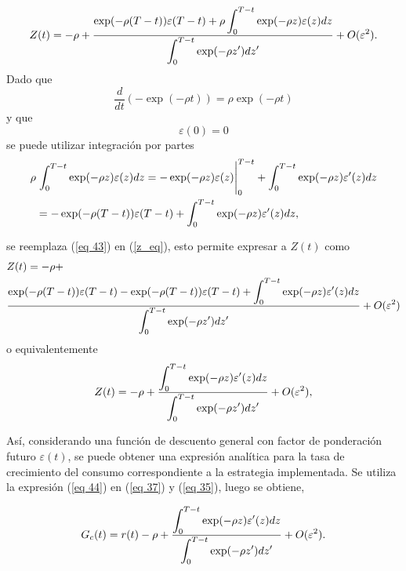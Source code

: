 \begin{equation}
\label{z_eq}
Z(t)=- \rho + \dfrac{\exp (-\rho (T-t)) \varepsilon(T-t)+ \rho \displaystyle  \int_0^{T-t} \exp (- \rho z) \varepsilon(z) dz }{\displaystyle \int_0^{T-t} \exp (- \rho z') dz' }+ O(\varepsilon^2).    
\end{equation}
%
\noindent Dado que
$$\dfrac{d}{dt}(- \exp (-\rho t))= \rho \exp(- \rho t)$$
%
y que 
$$\varepsilon(0)=0$$
%
\noindent se puede utilizar integración por partes
\begin{equation}
\label{eq 43}
    \begin{split}
        \rho &\displaystyle \left.\int_0^{T-t} \exp (- \rho z) \varepsilon(z) dz = - \exp (- \rho z) \varepsilon(z) \right|^{T-t}_ 0 + \displaystyle \int_0^{T-t} \exp (- \rho z) \varepsilon'(z) dz \\
        &= - \exp(- \rho(T-t)) \varepsilon(T-t) + \displaystyle \int_0^{T-t} \exp (- \rho z) \varepsilon'(z) dz,
    \end{split}
\end{equation}

\noindent se reemplaza (\ref{eq 43}) en (\ref{z_eq}), esto permite expresar a $Z(t)$ como
\begin{equation*}
 \begin{split}
    & Z(t)=  - \rho + \\ &\dfrac{\exp (-\rho (T-t)) \varepsilon(T-t)- \exp(- \rho(T-t)) \varepsilon(T-t) + \displaystyle \int_0^{T-t} \exp (- \rho z) \varepsilon'(z) dz}{\displaystyle \int_0^{T-t} \exp (- \rho z') dz' }+ O(\varepsilon^2)
 \end{split}    
\end{equation*}
o equivalentemente
\begin{equation}
\label{eq 44}
    Z(t)= - \rho + \dfrac{\displaystyle \int_0^{T-t} \exp(- \rho z ) \varepsilon' (z) dz}{\displaystyle \int_0^{T-t} \exp(- \rho z' )  dz'}+ O(\varepsilon^2),
\end{equation}

Así, considerando una función de descuento general con factor de ponderación futuro $\varepsilon(t)$, se puede obtener una expresión analítica para la tasa de crecimiento del consumo correspondiente a la estrategia implementada. Se utiliza la expresión (\ref{eq 44}) en (\ref{eq 37}) y (\ref{eq 35}), luego se obtiene,

\begin{equation}
\label{eq 45}
G_c(t)= r(t) - \rho +  \dfrac{\displaystyle \int_0^{T-t} \exp(- \rho z ) \varepsilon' (z) dz}{\displaystyle \int_0^{T-t} \exp(- \rho z' )  dz'}+ O(\varepsilon^2).
\end{equation}

